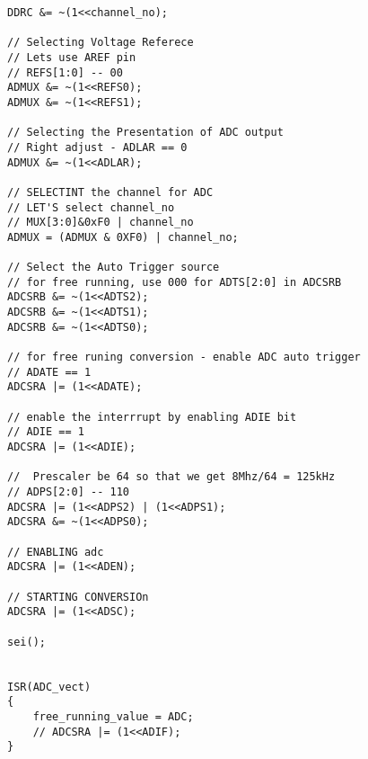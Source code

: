 \documentclass{article}
\begin{document}
\begin{verbatim}
DDRC &= ~(1<<channel_no);

// Selecting Voltage Referece
// Lets use AREF pin
// REFS[1:0] -- 00
ADMUX &= ~(1<<REFS0);
ADMUX &= ~(1<<REFS1);

// Selecting the Presentation of ADC output
// Right adjust - ADLAR == 0
ADMUX &= ~(1<<ADLAR);

// SELECTINT the channel for ADC
// LET'S select channel_no
// MUX[3:0]&0xF0 | channel_no
ADMUX = (ADMUX & 0XF0) | channel_no;

// Select the Auto Trigger source
// for free running, use 000 for ADTS[2:0] in ADCSRB 
ADCSRB &= ~(1<<ADTS2);
ADCSRB &= ~(1<<ADTS1);
ADCSRB &= ~(1<<ADTS0);

// for free runing conversion - enable ADC auto trigger
// ADATE == 1
ADCSRA |= (1<<ADATE);

// enable the interrrupt by enabling ADIE bit
// ADIE == 1
ADCSRA |= (1<<ADIE);

//  Prescaler be 64 so that we get 8Mhz/64 = 125kHz
// ADPS[2:0] -- 110
ADCSRA |= (1<<ADPS2) | (1<<ADPS1);
ADCSRA &= ~(1<<ADPS0);

// ENABLING adc
ADCSRA |= (1<<ADEN);

// STARTING CONVERSIOn
ADCSRA |= (1<<ADSC);

sei();


ISR(ADC_vect)
{
	free_running_value = ADC;
	// ADCSRA |= (1<<ADIF);
}

\end{verbatim}
\end{document}
